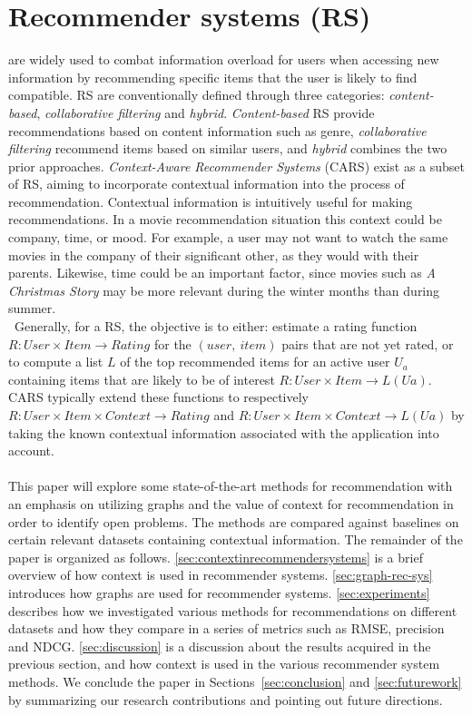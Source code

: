 \chapter{Recommender systems (RS)}\label{ch:introduction}
are widely used to combat information overload for users when accessing new information by recommending specific items that the user is likely to find compatible\cite{YouTubeNeural,IndustryPerspective}.
RS are conventionally defined through three categories: \textit{content-based}, \textit{collaborative filtering} and \textit{hybrid}.
\textit{Content-based} RS provide recommendations based on content information such as genre, \textit{collaborative filtering} recommend items based on similar users, and \textit{hybrid} combines the two prior approaches\cite{ContextSurvey2020}.
\textit{Context-Aware Recommender Systems} (CARS) exist as a subset of RS, aiming to incorporate contextual information into the process of recommendation.
Contextual information is intuitively useful for making recommendations.
In a movie recommendation situation this context could be company, time, or mood.
For example, a user may not want to watch the same movies in the company of their significant other, as they would with their parents.
Likewise, time could be an important factor, since movies such as \textit{A Christmas Story} may be more relevant during the winter months than during summer.\\\
Generally, for a RS, the objective is to either: estimate a rating function $R: User \times Item \rightarrow Rating$ for the $(user, \ item)$ pairs that are not yet rated, or to compute a list $L$ of the top recommended items for an active user $U_a$ containing items that are likely to be of interest $R: User \times Item \rightarrow L(Ua)$\cite{RecommenderHandbook2015}.
CARS typically extend these functions to respectively $R: User \times Item \times Context \rightarrow Rating$ and $R: User \times Item \times Context \rightarrow L(Ua)$ by taking the known contextual information associated with the application into account.
\\\\
This paper will explore some state-of-the-art methods for recommendation with an emphasis on utilizing graphs and the value of context for recommendation in order to identify open problems.
The methods are compared against baselines on certain relevant datasets containing contextual information.
The remainder of the paper is organized as follows. 
\autoref{sec:contextinrecommendersystems} is a brief overview of how context is used in recommender systems.
\autoref{sec:graph-rec-sys} introduces how graphs are used for recommender systems.
\autoref{sec:experiments} describes how we investigated various methods for recommendations on different datasets and how they compare in a series of metrics such as RMSE, precision and NDCG.
\autoref{sec:discussion} is a discussion about the results acquired in the previous section, and how context is used in the various recommender system methods.
We conclude the paper in Sections~\ref{sec:conclusion} and \ref{sec:futurework} by summarizing our research contributions and pointing out future directions.
